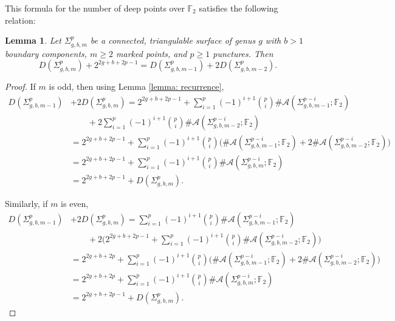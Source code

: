 \documentclass[reqno,12pt]{amsart}
\newtheorem{lemma}[thm]{Lemma}
\theoremstyle{definition}
\theoremstyle{remark}
\theoremstyle{remark}
\numberwithin{equation}{section}
\begin{document}
This formula for the number of deep points over $\mathbb{F}_2$ satisfies the following relation:
\begin{lemma}\label{lem: punc deep recursion}
	Let $\Sigma_{g,b,m}^p$ be a connected, triangulable surface of genus $g$ with $b>1$ boundary components, $m\geq 2$ marked points, and $p\geq 1$ punctures. Then
	 \[ D(\Sigma_{g,b,m}^p) + 2^{2g+b+2p-1} = D(\Sigma_{g,b,m-1}^p) + 2 D(\Sigma_{g,b,m-2}^p). \]	
\end{lemma}
\begin{proof}
	If $m$ is odd, then using Lemma \ref{lemma: recurrence}, 
	\begin{align*}
		D(\Sigma_{g,b,m-1}^p) &+ 2 D(\Sigma_{g,b,m}^p) = 2^{2g+b+2p-1} + \sum_{i=1}^p (-1)^{i+1}\binom{p}{i} \#\mathcal{A}(\Sigma_{g,b,m-1}^{p-i} ; \mathbb{F}_2) \\ &\quad \quad + 2 \sum_{i=1}^p (-1)^{i+1}\binom{p}{i} \#\mathcal{A}(\Sigma_{g,b,m-2}^{p-i} ; \mathbb{F}_2) \\
		&= 2^{2g+b+2p-1} + \sum_{i=1}^p (-1)^{i+1}\binom{p}{i} \big( \#\mathcal{A}(\Sigma_{g,b,m-1}^{p-i} ; \mathbb{F}_2) + 2 \#\mathcal{A}(\Sigma_{g,b,m-2}^{p-i} ; \mathbb{F}_2) \big) \\
		&= 2^{2g+b+2p-1} + \sum_{i=1}^p (-1)^{i+1}\binom{p}{i} \#\mathcal{A}(\Sigma_{g,b,m}^{p-i} ; \mathbb{F}_2) \\
		&=  2^{2g+b+2p-1} + D(\Sigma_{g,b,m}^p).
	\end{align*}	

Similarly, if $m$ is even,
\begin{align*}
	D(\Sigma_{g,b,m-1}^p) &+ 2 D(\Sigma_{g,b,m}^p) = \sum_{i=1}^p (-1)^{i+1}\binom{p}{i} \#\mathcal{A}(\Sigma_{g,b,m-1}^{p-i} ; \mathbb{F}_2) \\ &\quad \quad + 2 \bigg( 2^{2g+b+2p-1} + \sum_{i=1}^p (-1)^{i+1}\binom{p}{i} \#\mathcal{A}(\Sigma_{g,b,m-2}^{p-i} ; \mathbb{F}_2) \bigg) \\
	&= 2^{2g+b+2p} + \sum_{i=1}^p (-1)^{i+1}\binom{p}{i} \big( \#\mathcal{A}(\Sigma_{g,b,m-1}^{p-i} ; \mathbb{F}_2) + 2 \#\mathcal{A}(\Sigma_{g,b,m-2}^{p-i} ; \mathbb{F}_2) \big) \\
	&= 2^{2g+b+2p} + \sum_{i=1}^p (-1)^{i+1}\binom{p}{i} \#\mathcal{A}(\Sigma_{g,b,m}^{p-i} ; \mathbb{F}_2) \\
	&= 2^{2g+b+2p-1} + D(\Sigma_{g,b,m}^p).
\end{align*}	
\end{proof}
\end{document}
